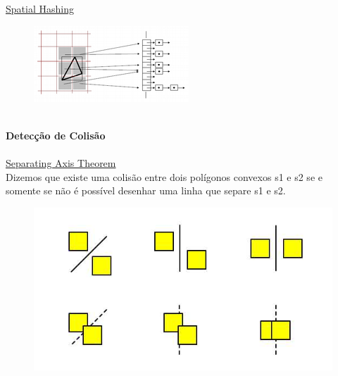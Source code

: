 \documentclass[plainboxedsections]{sciposter}
\begin{document}
\begin{multicols}{2}
\begin{figure}
  \end{figure}
  \underline{Spatial Hashing}\\
  \begin{figure}
    \includegraphics[scale=3]{sh.png}
  \end{figure}
  \\[1ex]
  \textbf{Detecção de Colisão} \\
  \\[1ex]
  \underline{Separating Axis Theorem}
  \\[1ex]
  Dizemos que existe uma colisão entre dois polígonos convexos s1 e s2 se e somente se não é possível desenhar uma linha que separe s1 e s2.
  \begin{figure}
    \centering
    \includegraphics[scale=1.5]{SAT.jpg}
  \end{figure}


\end{multicols}
\end{document}
